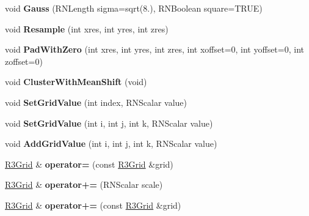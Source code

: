 \begin{DoxyCompactItemize}
\item 
void {\bfseries Gauss} (R\+N\+Length sigma=sqrt(8.), R\+N\+Boolean square=T\+R\+UE)\hypertarget{class_r3_grid_a810bb08b0b9f06683b0d644d6c15be46}{}\label{class_r3_grid_a810bb08b0b9f06683b0d644d6c15be46}

\item 
void {\bfseries Resample} (int xres, int yres, int zres)\hypertarget{class_r3_grid_a7b6f21015449cea493b9a6024294832d}{}\label{class_r3_grid_a7b6f21015449cea493b9a6024294832d}

\item 
void {\bfseries Pad\+With\+Zero} (int xres, int yres, int zres, int xoffset=0, int yoffset=0, int zoffset=0)\hypertarget{class_r3_grid_ac95653c58e341f4d958b6c27baf72f61}{}\label{class_r3_grid_ac95653c58e341f4d958b6c27baf72f61}

\item 
void {\bfseries Cluster\+With\+Mean\+Shift} (void)\hypertarget{class_r3_grid_a2a19534deaa0527981086939880ebba5}{}\label{class_r3_grid_a2a19534deaa0527981086939880ebba5}

\item 
void {\bfseries Set\+Grid\+Value} (int index, R\+N\+Scalar value)\hypertarget{class_r3_grid_a74e2d1b586c58448fd27004e8a121e1c}{}\label{class_r3_grid_a74e2d1b586c58448fd27004e8a121e1c}

\item 
void {\bfseries Set\+Grid\+Value} (int i, int j, int k, R\+N\+Scalar value)\hypertarget{class_r3_grid_a45e1188ab7ac8912872235076555b2d0}{}\label{class_r3_grid_a45e1188ab7ac8912872235076555b2d0}

\item 
void {\bfseries Add\+Grid\+Value} (int i, int j, int k, R\+N\+Scalar value)\hypertarget{class_r3_grid_ad99264ba45cbc7bcd2c29858341baba1}{}\label{class_r3_grid_ad99264ba45cbc7bcd2c29858341baba1}

\item 
\hyperlink{class_r3_grid}{R3\+Grid} \& {\bfseries operator=} (const \hyperlink{class_r3_grid}{R3\+Grid} \&grid)\hypertarget{class_r3_grid_a51a010d2037d0dd2c441bb389f68508b}{}\label{class_r3_grid_a51a010d2037d0dd2c441bb389f68508b}

\item 
\hyperlink{class_r3_grid}{R3\+Grid} \& {\bfseries operator+=} (R\+N\+Scalar scale)\hypertarget{class_r3_grid_a73e42fb1dbcf363cd0062a0346fff738}{}\label{class_r3_grid_a73e42fb1dbcf363cd0062a0346fff738}

\item 
\hyperlink{class_r3_grid}{R3\+Grid} \& {\bfseries operator+=} (const \hyperlink{class_r3_grid}{R3\+Grid} \&grid)\hypertarget{class_r3_grid_ae205c5b18ca6d53c71c29d10a8b7bc2c}{}\label{class_r3_grid_ae205c5b18ca6d53c71c29d10a8b7bc2c}


\end{DoxyCompactItemize}
